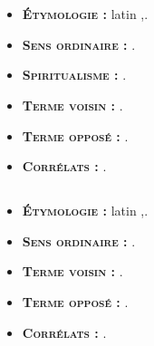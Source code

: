 \chapter{}
\section{}
{\footnotesize
\begin{itemize}[leftmargin=1cm, label=, itemsep=1pt]
\item {\bf \textsc{Étymologie} :} latin {\it },.
\item {\bf \textsc{Sens ordinaire} :} .
\item {\bf \textsc{Spiritualisme} :} .
\end{itemize}

\begin{itemize}[leftmargin=1cm, label=, itemsep=1pt]
\item {\bf \textsc{Terme voisin} :} .
\item {\bf \textsc{Terme opposé} :} .
\item {\bf \textsc{Corrélats} :} .
\end{itemize}
}

\section{}
{\footnotesize
\begin{itemize}[leftmargin=1cm, label=, itemsep=1pt]
\item {\bf \textsc{Étymologie} :} latin {\it },.
\item {\bf \textsc{Sens ordinaire} :} .
\item {\bf \textsc{Terme voisin} :} .
\item {\bf \textsc{Terme opposé} :} .
\item {\bf \textsc{Corrélats} :} .
\end{itemize}
}
